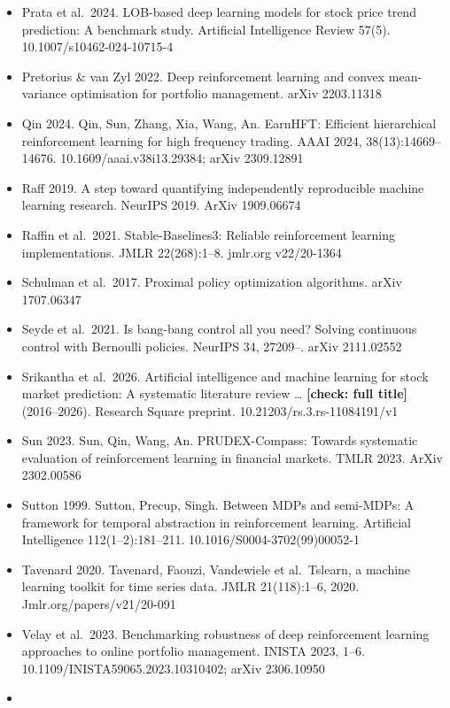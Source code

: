 \documentclass[12pt,a4paper]{report}
\begin{document}
\begin{itemize}
  2211.14730
\item
  Prata et al.~2024. LOB-based deep learning models for stock price
  trend prediction: A benchmark study. Artificial Intelligence Review
  57(5). 10.1007/s10462-024-10715-4
\item
  Pretorius \& van Zyl 2022. Deep reinforcement learning and convex
  mean-variance optimisation for portfolio management. arXiv 2203.11318
\item
  Qin 2024. Qin, Sun, Zhang, Xia, Wang, An. EarnHFT: Efficient
  hierarchical reinforcement learning for high frequency trading. AAAI
  2024, 38(13):14669--14676. 10.1609/aaai.v38i13.29384; arXiv 2309.12891
\item
  Raff 2019. A step toward quantifying independently reproducible
  machine learning research. NeurIPS 2019. ArXiv 1909.06674
\item
  Raffin et al.~2021. Stable-Baselines3: Reliable reinforcement learning
  implementations. JMLR 22(268):1--8. jmlr.org v22/20-1364
\item
  Schulman et al.~2017. Proximal policy optimization algorithms. arXiv
  1707.06347
\item
  Seyde et al.~2021. Is bang-bang control all you need? Solving
  continuous control with Bernoulli policies. NeurIPS 34, 27209--. arXiv
  2111.02552
\item
  Srikantha et al.~2026. Artificial intelligence and machine learning
  for stock market prediction: A systematic literature review \ldots{}
  \textbf{{[}check: full title{]}} (2016--2026). Research Square
  preprint. 10.21203/rs.3.rs-11084191/v1
\item
  Sun 2023. Sun, Qin, Wang, An. PRUDEX-Compass: Towards systematic
  evaluation of reinforcement learning in financial markets. TMLR 2023.
  ArXiv 2302.00586
\item
  Sutton 1999. Sutton, Precup, Singh. Between MDPs and semi-MDPs: A
  framework for temporal abstraction in reinforcement learning.
  Artificial Intelligence 112(1--2):181--211.
  10.1016/S0004-3702(99)00052-1
\item
  Tavenard 2020. Tavenard, Faouzi, Vandewiele et al.~Tslearn, a machine
  learning toolkit for time series data. JMLR 21(118):1--6, 2020.
  Jmlr.org/papers/v21/20-091
\item
  Velay et al.~2023. Benchmarking robustness of deep reinforcement
  learning approaches to online portfolio management. INISTA 2023, 1--6.
  10.1109/INISTA59065.2023.10310402; arXiv 2306.10950
\item

\end{itemize}
\end{document}
